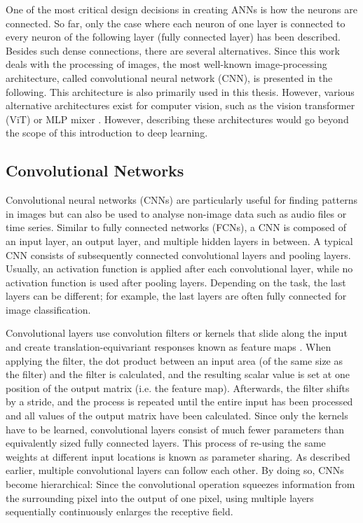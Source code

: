 One of the most critical design decisions in creating ANNs is how the neurons are connected.
So far, only the case where each neuron of one layer is connected to every neuron of the following layer (fully connected layer) has been described. 
Besides such dense connections, there are several alternatives.
Since this work deals with the processing of images, the most well-known image-processing architecture, called convolutional neural network (CNN), is presented in the following. This architecture is also primarily used in this thesis. However, various alternative architectures exist for computer vision, such as the vision transformer (ViT)  or MLP mixer . However, describing these architectures would go beyond the scope of this introduction to deep learning.

\subsection{Convolutional Networks}
Convolutional neural networks (CNNs) are particularly useful for finding patterns in images but can also be used to analyse non-image data such as audio files or time series.
Similar to fully connected networks (FCNs), a CNN is composed of an input layer, an output layer, and multiple hidden layers in between.
A typical CNN consists of subsequently connected convolutional layers and pooling layers.
Usually, an activation function is applied after each convolutional layer, while no activation function is used after pooling layers.
Depending on the task, the last layers can be different; for example, the last layers are often fully connected for image classification.

Convolutional layers use convolution filters or kernels that slide along the input and create translation-equivariant  responses known as feature maps .
When applying the filter, the dot product between an input area (of the same size as the filter) and the filter is calculated, and the resulting scalar value is set at one position of the output matrix (i.e. the feature map).
Afterwards, the filter shifts by a stride, and the process is repeated until the entire input has been processed and all values of the output matrix have been calculated.
Since only the kernels have to be learned, convolutional layers consist of much fewer parameters than equivalently sized fully connected layers.
This process of re-using the same weights at different input locations is known as parameter sharing.
As described earlier, multiple convolutional layers can follow each other.
By doing so, CNNs become hierarchical: Since the convolutional operation squeezes information from the surrounding pixel into the output of one pixel, using multiple layers sequentially continuously enlarges the receptive field.

